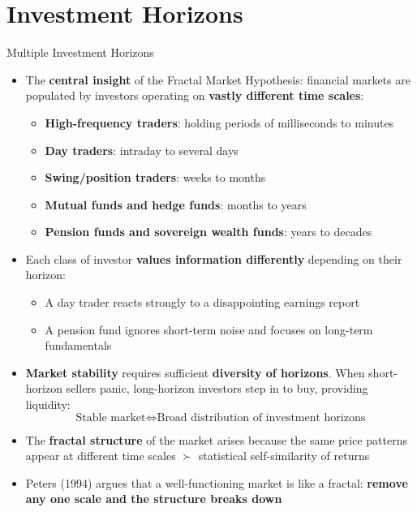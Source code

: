 \documentclass[9pt, aspectratio=169, t]{beamer}
\theoremstyle{definition}
\begin{document}
\section{Investment Horizons}

\begin{frame}{Multiple Investment Horizons}
    \begin{itemize}
        \item The \textbf{central insight} of the Fractal Market Hypothesis: financial markets are populated by investors operating on \textbf{vastly different time scales}:
        \begin{itemize}
            \item \textbf{High-frequency traders}: holding periods of milliseconds to minutes
            \item \textbf{Day traders}: intraday to several days
            \item \textbf{Swing/position traders}: weeks to months
            \item \textbf{Mutual funds and hedge funds}: months to years
            \item \textbf{Pension funds and sovereign wealth funds}: years to decades
        \end{itemize}
        \item Each class of investor \textbf{values information differently} depending on their horizon:
        \begin{itemize}
            \item A day trader reacts strongly to a disappointing earnings report
            \item A pension fund ignores short-term noise and focuses on long-term fundamentals
        \end{itemize}
        \item \textbf{Market stability} requires sufficient \textbf{diversity of horizons}. When short-horizon sellers panic, long-horizon investors step in to buy, providing liquidity:
        \[
            \text{Stable market} \iff \text{Broad distribution of investment horizons}
        \]
        \item The \textbf{fractal structure} of the market arises because the same price patterns appear at different time scales $\succ$ statistical self-similarity of returns
        \item Peters (1994) argues that a well-functioning market is like a fractal: \textbf{remove any one scale and the structure breaks down}
    \end{itemize}
\end{frame}
\end{document}
